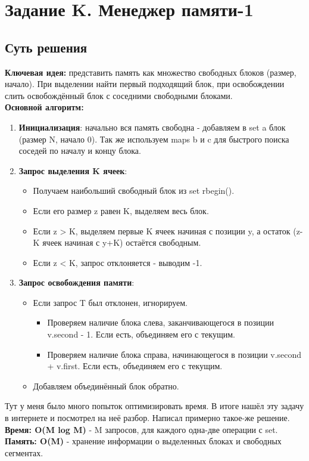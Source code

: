 \documentclass[a4paper,12pt]{article}
\begin{document}
    \newpage


    \section{Задание K. Менеджер памяти-1}

    

    \subsection*{Суть решения}
    \textbf{Ключевая идея:} представить память как множество свободных блоков (размер, начало). При выделении найти первый подходящий блок, при освобождении слить освобождённый блок с соседними свободными блоками.\\
    \textbf{Основной алгоритм:}
    \begin{enumerate}
        \item \textbf{Инициализация}: начально вся память свободна - добавляем в set a блок (размер N, начало 0). Так же используем maps b и c для быстрого поиска соседей по началу и концу блока.
        \item \textbf{Запрос выделения K ячеек}:
        \begin{itemize}
            \item Получаем наибольший свободный блок из set rbegin().
            \item Если его размер z равен K, выделяем весь блок.
            \item Если z > K, выделяем первые K ячеек начиная с позиции y, а остаток (z-K ячеек начиная с y+K) остаётся свободным.
            \item Если z < K, запрос отклоняется - выводим -1.
        \end{itemize}
        \item \textbf{Запрос освобождения памяти}:
        \begin{itemize}
            \item Если запрос T был отклонен, игнорируем.
            \begin{itemize}
                \item Проверяем наличие блока слева, заканчивающегося в позиции v.second - 1. Если есть, объединяем его с текущим.
                \item Проверяем наличие блока справа, начинающегося в позиции v.second + v.first. Если есть, объединяем его с текущим.
            \end{itemize}
            \item Добавляем объединённый блок обратно.
        \end{itemize}
    \end{enumerate}
    Тут у меня было много попыток оптимизировать время. В итоге нашёл эту задачу в интернете и посмотрел на неё разбор. Написал примерно такое-же решение.\\
    \textbf{Время: O(M log M)} - M запросов, для каждого одна-две операции с set.\\
    \textbf{Память: O(M)} - хранение информации о выделенных блоках и свободных сегментах.
\end{document}
